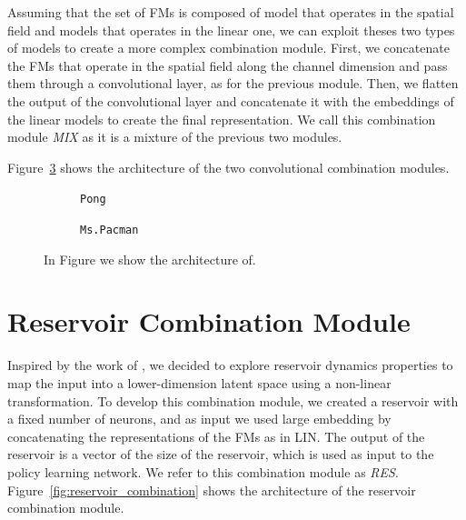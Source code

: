 Assuming that the set of FMs is composed of model that operates in the spatial field and models that operates in the linear one, we can exploit theses two types of models to create a more complex combination module.
First, we concatenate the FMs that operate in the spatial field along the channel dimension and pass them through a convolutional layer, as for the previous module.
Then, we flatten the output of the convolutional layer and concatenate it with the embeddings of the linear models to create the final representation.
We call this combination module \textit{MIX} as it is a mixture of the previous two modules.

Figure~\ref{fig:conv_combination} shows the architecture of the two convolutional combination modules.

\begin{figure}[ht]
    \centering
    \begin{subfigure}[b]{0.47\textwidth}
        \centering
        \fbox{\rule[-.5cm]{0cm}{4cm} \rule[-.5cm]{4cm}{0cm}}
        \caption{\texttt{Pong}}
        \label{fig:cnn}
    \end{subfigure}
    \hfill
    \begin{subfigure}[b]{0.47\textwidth}
        \centering
        \fbox{\rule[-.5cm]{0cm}{4cm} \rule[-.5cm]{4cm}{0cm}}
        \caption{\texttt{Ms.Pacman}}
        \label{fig:mix}
    \end{subfigure}

    \caption{In Figure we show the architecture of.}
    \label{fig:conv_combination}
\end{figure}

\section{Reservoir Combination Module}
\label{sec:reservoir_combination}
Inspired by the work of \citet{gallicchio2017}, we decided to explore reservoir dynamics properties to map the input into a lower-dimension latent space using a non-linear transformation.
To develop this combination module, we created a reservoir with a fixed number of neurons, and as input we used large embedding by concatenating the representations of the FMs as in LIN\@.
The output of the reservoir is a vector of the size of the reservoir, which is used as input to the policy learning network.
We refer to this combination module as \textit{RES}.
Figure~\ref{fig:reservoir_combination} shows the architecture of the reservoir combination module.


